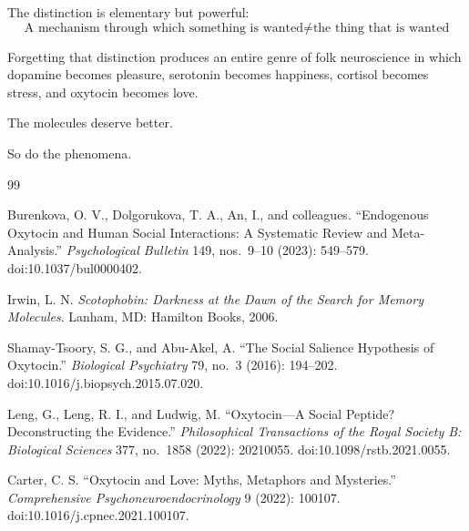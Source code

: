 \documentclass[12pt]{article}
\begin{document}
The distinction is elementary but powerful:
\[
\boxed{
\text{A mechanism through which something is wanted}
\neq
\text{the thing that is wanted}
}
\]

Forgetting that distinction produces an entire genre of folk neuroscience in which dopamine becomes pleasure, serotonin becomes happiness, cortisol becomes stress, and oxytocin becomes love.

The molecules deserve better.

So do the phenomena.

\begin{thebibliography}{99}

Burenkova, O. V., Dolgorukova, T. A., An, I., and colleagues.
``Endogenous Oxytocin and Human Social Interactions: A Systematic Review and Meta-Analysis.''
\textit{Psychological Bulletin} 149, nos.~9--10 (2023): 549--579.
doi:10.1037/bul0000402.

Irwin, L. N.
\textit{Scotophobin: Darkness at the Dawn of the Search for Memory Molecules}.
Lanham, MD: Hamilton Books, 2006.

Shamay-Tsoory, S. G., and Abu-Akel, A.
``The Social Salience Hypothesis of Oxytocin.''
\textit{Biological Psychiatry} 79, no.~3 (2016): 194--202.
doi:10.1016/j.biopsych.2015.07.020.

Leng, G., Leng, R. I., and Ludwig, M.
``Oxytocin---A Social Peptide? Deconstructing the Evidence.''
\textit{Philosophical Transactions of the Royal Society B: Biological Sciences} 377, no.~1858 (2022): 20210055.
doi:10.1098/rstb.2021.0055.

Carter, C. S.
``Oxytocin and Love: Myths, Metaphors and Mysteries.''
\textit{Comprehensive Psychoneuroendocrinology} 9 (2022): 100107.
doi:10.1016/j.cpnec.2021.100107.

\end{thebibliography}
\end{document}
